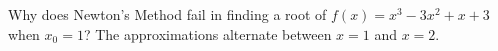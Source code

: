 {Why does Newton's Method fail in finding a root of $f(x) = x^3-3x^2+x+3$ when $x_0=1$?
}
{The approximations alternate between $x=1$ and $x=2$.
}

